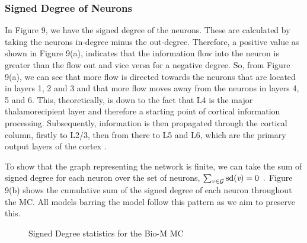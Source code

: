 \subsubsection{Signed Degree of Neurons}
In Figure 9, we have the signed degree of the neurons. These are calculated by taking the neurons in-degree minus the out-degree. Therefore, a positive value as shown in Figure 9(a), indicates that the information flow into the neuron is greater than the flow out and vice versa for a negative degree. So, from Figure 9(a), we can see that more flow is directed towards the neurons that are located in layers 1, 2 and 3 and that more flow moves away from the neurons in layers 4, 5 and 6. This, theoretically, is down to the fact that L4 is the major thalamorecipient layer and therefore a starting point of cortical information processing. Subsequently, information is then propagated through the cortical column, firstly to L2/3, then from there to L5 and L6, which are the primary output layers of the cortex \cite{10.3389/fnana.2017.00091}. 

To show that the graph representing the network is finite, we can take the sum of signed degree for each neuron over the set of neurons, $\sum_{v \in \mathcal{G}}\text{sd}(\emph{v}) = 0 \enspace{.}$ Figure 9(b) shows the cumulative sum of the signed degree of each neuron throughout the MC. All models barring the \ER model follow this pattern as we aim to preserve this. 

\begin{figure}[H]%
    \centering
    \captionsetup{justification=centering}
    \qquad
    \caption{Signed Degree statistics for the Bio-M MC}%
    \label{fig:example}%
\end{figure}